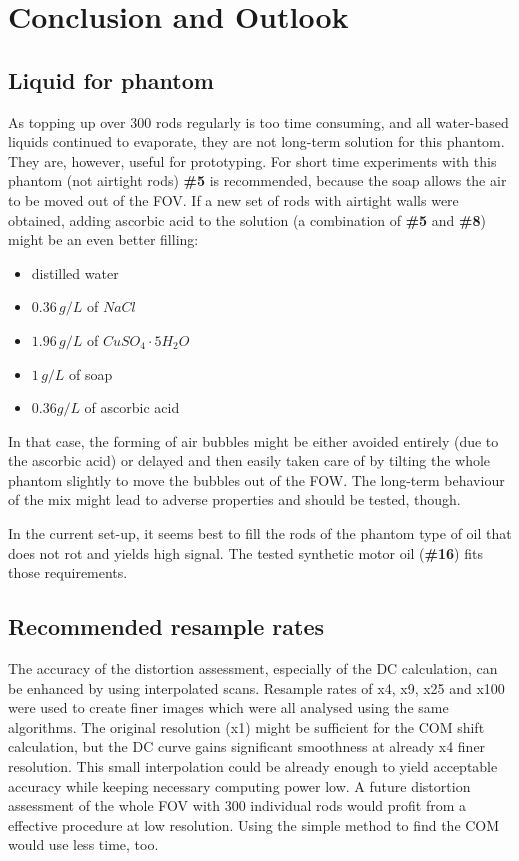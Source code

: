 
\chapter{Conclusion and Outlook}
\section{Liquid for phantom}

As topping up over 300 rods regularly is too time consuming, and all water-based liquids continued to evaporate, they are not long-term solution for this phantom.
They are, however, useful for prototyping.
For short time experiments with this phantom (not airtight rods) \textbf{\#5} is recommended, because the soap allows the air to be moved out of the FOV.
If a new set of rods with airtight walls were obtained, adding ascorbic acid to the solution (a combination of \textbf{\#5} and \textbf{\#8}) might be an even better filling:
\begin{itemize}
\item  distilled water
\item  $0.36 \, g/L$ of $NaCl$
\item  $1.96 \, g/L$ of $CuSO_4\cdot5H_2O$
\item  $1 \, g/L$ of soap
\item  $0.36 g/L$ of ascorbic acid
\end{itemize}
In that case, the forming of air bubbles might be either avoided entirely (due to the ascorbic acid) or delayed and then easily taken care of by tilting the whole phantom slightly to move the bubbles out of the FOW.
The long-term behaviour of the mix might lead to adverse properties and should be tested, though.

In the current set-up, it seems best to fill the rods of the phantom type of oil that does not rot and yields high signal.
The tested synthetic motor oil (\textbf{\#16}) fits those requirements.

\section{Recommended resample rates}

The accuracy of the distortion assessment, especially of the DC calculation, can be enhanced by using interpolated scans.
Resample rates of x4, x9, x25 and x100 were used to create finer images which were all analysed using the same algorithms.
The original resolution (x1) might be sufficient for the COM shift calculation, but the DC curve gains significant smoothness at already x4 finer resolution.
This small interpolation could be already enough to yield acceptable accuracy while keeping necessary computing power low.
A future distortion assessment of the whole FOV with 300 individual rods would profit from a effective procedure at low resolution.
Using the simple method to find the COM would use less time, too.

